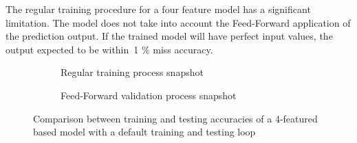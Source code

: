 The regular training procedure for a four feature model has a significant limitation. The model does not take into account the Feed-Forward application of the prediction output.
If the trained model will have perfect input values, the output expected to be within~1 \% miss accuracy.
\begin{figure}[htbp]
    \centering
    \begin{subfigure}[b]{0.45\textwidth}
        \centering
        
        \caption{Regular training process snapshot}
        \label{subfig:regular_tr}
    \end{subfigure}
    \hfill
    \begin{subfigure}[b]{0.45\textwidth}
        \centering
        
        \caption{Feed-Forward validation process snapshot}
        \label{subfig:regular_ts}
    \end{subfigure}
    \caption{Comparison between training and testing accuracies of a 4-featured based model with a default training and testing loop}
    \label{fig:regular_tr}
\end{figure}


